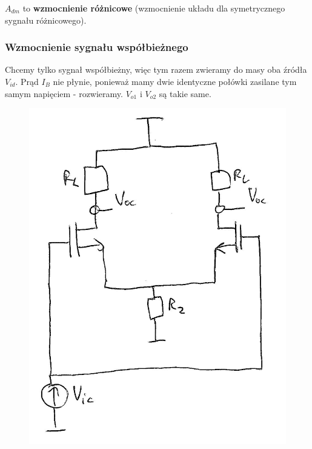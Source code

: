 \documentclass[10pt,a4paper]{article}
\begin{document}
$A_{dm}$ to \textbf{wzmocnienie różnicowe} (wzmocnienie układu dla symetrycznego sygnału różnicowego).

\subsubsection{Wzmocnienie sygnału współbieżnego}

Chcemy tylko sygnał współbieżny, więc tym razem zwieramy do masy oba źródła $V_{id}$. Prąd $I_{B}$ nie płynie, ponieważ mamy dwie identyczne połówki zasilane tym samym napięciem - rozwieramy. $V_{o1}$ i $V_{o2}$ są takie same. 
\begin{figure}[H]
\centering
\includegraphics[scale=1]{roznicowy_wsp}
\end{figure}
\end{document}
